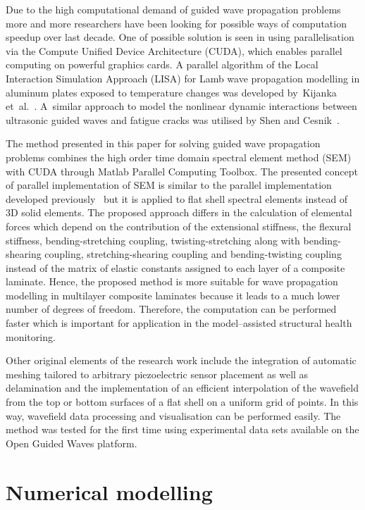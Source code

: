 \documentclass[preprint,12pt]{elsarticle}
\begin{document}
	Due to the high computational demand of guided wave propagation problems more and more researchers have been looking for possible ways of computation speedup over last decade. One of possible solution is seen in using parallelisation via the Compute Unified Device Architecture (CUDA), which enables parallel computing on powerful graphics cards. A parallel algorithm of the Local Interaction Simulation Approach (LISA) for Lamb wave propagation modelling in aluminum plates exposed to temperature changes was developed by~Kijanka et~al.~\cite{Kijanka2013}. A~similar approach to model the nonlinear dynamic interactions between ultrasonic guided waves and fatigue cracks was utilised by Shen and Cesnik~\cite{Shen2017}.  
	
	The method presented in this paper for solving guided wave propagation problems combines the high order time domain spectral element method (SEM) with CUDA through Matlab Parallel Computing Toolbox. The presented concept of parallel implementation of SEM is similar to the parallel implementation developed previously~\cite{Kudela2016} but it is applied to flat shell spectral elements instead of 3D solid elements. The proposed approach differs in the calculation of elemental forces which depend on the contribution of the extensional stiffness, the flexural stiffness, bending-stretching coupling,  twisting-stretching along with bending-shearing coupling, stretching-shearing coupling and bending-twisting coupling instead of the matrix of elastic constants assigned to each layer of a composite laminate. Hence, the proposed method is more suitable for wave propagation modelling in multilayer composite laminates because it leads to a much lower number of degrees of freedom. Therefore, the computation can be performed faster which is important for application in the model--assisted structural health monitoring. 
	
	Other original elements of the research work include the integration of automatic meshing tailored to arbitrary piezoelectric sensor placement as well as delamination and the implementation of an efficient interpolation of the wavefield from the top or bottom surfaces of a flat shell on a uniform grid of points. In this way, wavefield data processing and visualisation can be performed easily. The method was tested for the first time using experimental data sets available on the Open Guided Waves platform.
	
	\section{Numerical modelling}
	
\end{document}
